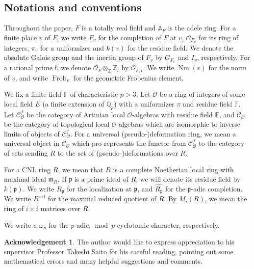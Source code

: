 \documentclass[12pt]{amsart}
\theoremstyle{plain}
\theoremstyle{definition}
\newtheorem*{ack}{Acknowledgement}
\theoremstyle{remark}
\begin{document}

\subsection{Notations and conventions}
Throughout the paper, $F$ is a totally real field and $\mathbb{A}_F$ is the adele ring. For a finite place $v$ of $F$, we write $F_v$ for the completion of $F$ at $v$, $\mathcal{O}_{F_v}$ for its ring of integers, $\pi_v$ for a uniformizer and $k(v)$ for the residue field. We denote the absolute Galois group and the inertia group of $F_v$ by $G_{F_v}$ and $I_v$, respectively. For a rational prime $l$, we denote $\mathcal{O}_F \otimes_\mathbb{Z} \mathbb{Z}_l$ by $\mathcal{O}_{F,l}$. We write $\operatorname{Nm}(v)$ for the norm of $v$, and write $\operatorname{Frob}_v$ for the geometric Frobenius element. 

We fix a finite field $\mathbb{F}$ of characteristic $p>3$. Let $\mathcal{O}$ be a ring of integers of some local field $E$ (a finite extension of $\mathbb{Q}_p$) with a uniformizer $\pi$ and residue field $\mathbb{F}$. Let $\mathscr{C}_{\mathcal{O}}^{f}$ be the category of Artinian local $\mathcal{O}$-algebras with residue field $\mathbb{F}$, and $\mathscr{C}_{\mathcal{O}}$ be the category of topological local $\mathcal{O}$-algebras which are isomorphic to inverse limits of objects of $\mathscr{C}_{\mathcal{O}}^{f}$. For a universal (pseudo-)deformation ring, we mean a universal object in $\mathscr{C}_{\mathcal{O}}$ which pro-represents the functor from $\mathscr{C}_{\mathcal{O}}^{f}$ to the category of sets sending $R$ to the set of (pseudo-)deformations over $R$.

For a CNL ring $R$, we mean that $R$ is a complete Noetherian local ring with maximal ideal $\mathfrak{m}_R$. If $\mathfrak{p}$ is a prime ideal of $R$, we will denote its residue field by $k(\mathfrak{p})$. We write $R_{\mathfrak{p}}$ for the localization at $\mathfrak{p}$, and $\widehat{R_{\mathfrak{p}}}$ for the $\mathfrak{p}$-adic completion. We write $R^{\operatorname{red}}$ for the maximal reduced quotient of $R$. By $M_i(R)$, we mean the ring of $i \times i$ matrices over $R$.

We write $\epsilon, \omega_p$ for the $p$-adic, $\operatorname{mod}~p$ cyclotomic character, respectively.

\begin{ack}
	The author would like to express appreciation to his supervisor Professor Takeshi Saito for his careful reading,  pointing out some mathematical errors and many helpful suggestions and comments.
\end{ack}
\end{document}
